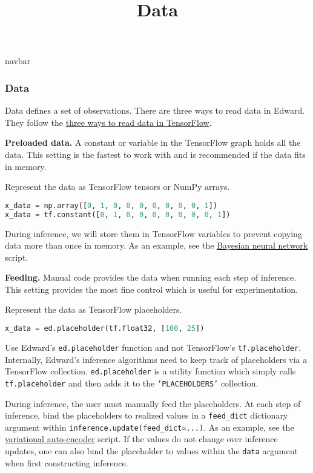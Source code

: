 \title{Data}

{{navbar}}

\subsubsection{Data}

Data defines a set of observations. There are three ways
to read data in Edward. They follow the
\href{https://www.tensorflow.org/versions/master/how_tos/reading_data/index.html}
{three ways to read data in TensorFlow}.

\textbf{Preloaded data.}
A constant or variable in the TensorFlow graph holds all the data.
This setting is the fastest to work with and is recommended if the
data fits in memory.

Represent the data as TensorFlow tensors or NumPy arrays.

\begin{lstlisting}[language=Python]
x_data = np.array([0, 1, 0, 0, 0, 0, 0, 0, 0, 1])
x_data = tf.constant([0, 1, 0, 0, 0, 0, 0, 0, 0, 1])
\end{lstlisting}

During inference, we will store them in TensorFlow variables to
prevent copying data more than once in memory. As an example, see the
\href{https://github.com/blei-lab/edward/blob/master/examples/bayesian_nn.py}
{Bayesian neural network} script.

\textbf{Feeding.}
Manual code provides the data when running each step of inference.
This setting provides the most fine control which is useful for
experimentation.

Represent the data as TensorFlow placeholders.

\begin{lstlisting}[language=Python]
x_data = ed.placeholder(tf.float32, [100, 25])
\end{lstlisting}

Use Edward's \texttt{ed.placeholder} function and not TensorFlow's
\texttt{tf.placeholder}. Internally, Edward's inference algorithms
need to keep track of placeholders via a TensorFlow collection.
\texttt{ed.placeholder} is a utility function which simply calls
\texttt{tf.placeholder} and then adds it to the
\texttt{'PLACEHOLDERS'} collection.

During inference, the user must manually feed the placeholders. At each
step of inference, bind the placeholders to realized values in a
\texttt{feed_dict} dictionary argument within
\texttt{inference.update(feed_dict={...})}. As an example, see the
\href{https://github.com/blei-lab/edward/blob/master/examples/vae.py}
{variational auto-encoder} script.
If the values do not change over inference updates, one can also bind
the placeholder to values within the \texttt{data} argument when
first constructing inference.

